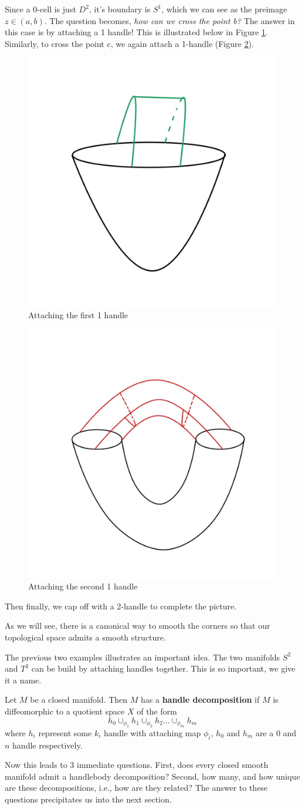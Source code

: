 \begin{example}
Since a 0-cell is just $D^{2}$, it's boundary is $S^{1}$, which we can see as the preimage $z\in (a,b)$. The question becomes, \textit{how can we cross the point b?} The answer in this case is by attaching a 1 handle! This is illustrated below in Figure \ref{fig:1handleT}. Similarly, to cross the point c, we again attach a 1-handle (Figure \ref{fig:1handleT2}).
\begin{figure}[h]
    \centering
    \includegraphics[width = .3\linewidth]{Images_Lect1/1handle.jpeg}
    \caption{Attaching the first 1 handle}
    \label{fig:1handleT}
\end{figure}
\begin{figure}[h]
    \centering
    \includegraphics[width = .3\linewidth]{Images_Lect1/1handle2.jpeg}
    \caption{Attaching the second 1 handle}
    \label{fig:1handleT2}
\end{figure}Then finally, we cap off with a 2-handle to complete the picture.
\end{example}
\begin{remark}
As we will see, there is a canonical way to smooth the corners so that our topological space admits a smooth structure.
\end{remark}

The previous two examples illustrates an important idea. The two manifolds $S^{2}$ and $T^{2}$ can be build by attaching handles together. This is so important, we give it a name.
\begin{definition}
Let $M$ be a closed manifold. Then $M$ has a \textbf{handle decomposition} if $M$ is diffeomorphic to a quotient space $X$ of the form
\[
h_{0}\cup_{\phi_{1}}h_{1}\cup_{\phi_{2}}h_{2}...\cup_{\phi_{m}}h_{m}
\]
where $h_{i}$ represent some $k_{i}$ handle with attaching map $\phi_{i}$, $h_{0}$ and $h_{m}$ are a 0 and $n$ handle respectively.
\end{definition}
Now this leads to 3 immediate questions. First, does every closed smooth manifold admit a handlebody decomposition? Second, how many, and how unique are these decompositions, i.e., how are they related? The answer to these questions precipitates us into the next section.

